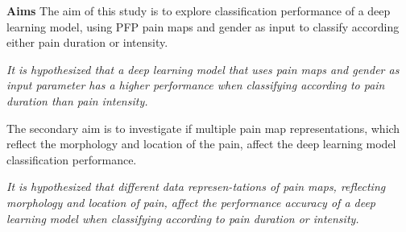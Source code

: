 \noindent
\textbf{Aims}\newline
\noindent
The aim of this study is to explore classification performance of a deep learning model, using PFP pain maps and gender as input to classify according either pain duration or intensity.


\begin{center}
\textit{It is hypothesized that a deep learning model that uses pain maps and gender as input parameter has a higher performance when classifying according to pain duration than pain intensity.}
\end{center}

\noindent
The secondary aim is to investigate if multiple pain map representations, which reflect the morphology and location of the pain, affect the deep learning model classification performance.                                                   
\begin{center}
\textit{It is hypothesized that different data represen-\newline tations of pain maps, reflecting morphology and location of pain, affect the performance
accuracy of a deep learning model when classifying according to pain duration or intensity.
}
\end{center}
